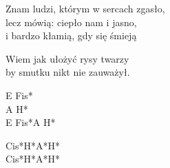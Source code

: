 \begin{text}
Znam ludzi, którym w sercach zgasło,\\
lecz mówią: ciepło nam i jasno,\\
i bardzo kłamią, gdy się śmieją

Wiem jak ułożyć rysy twarzy\\
by smutku nikt nie zauważył.
\end{text}
\begin{chord}
E Fis*\\
A H*\\
E Fis*A H*

Cis*H*A*H*\\
Cis*H*A*H*
\end{chord}